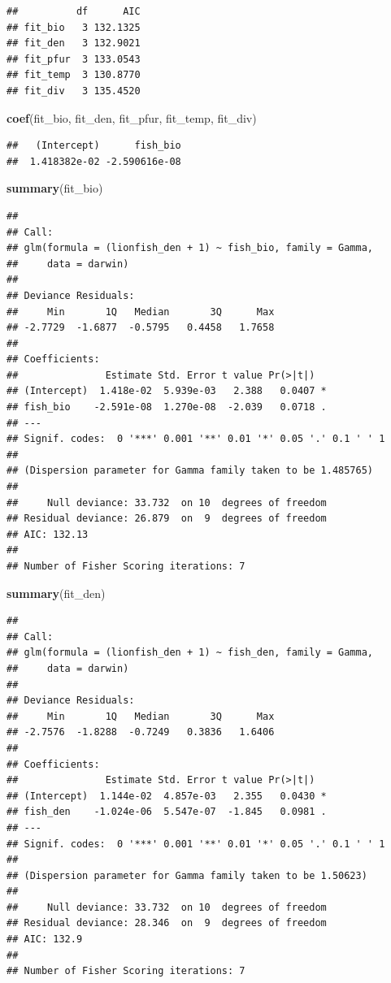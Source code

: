 \documentclass[]{article}
\newenvironment{Shaded}{\begin{snugshade}}{\end{snugshade}}
\newcommand{\KeywordTok}[1]{\textcolor[rgb]{0.13,0.29,0.53}{\textbf{#1}}}
\newcommand{\NormalTok}[1]{#1}
\begin{document}
\begin{verbatim}
##          df      AIC
## fit_bio   3 132.1325
## fit_den   3 132.9021
## fit_pfur  3 133.0543
## fit_temp  3 130.8770
## fit_div   3 135.4520
\end{verbatim}

\begin{Shaded}
\begin{Highlighting}[]
\KeywordTok{coef}\NormalTok{(fit_bio, fit_den, fit_pfur, fit_temp, fit_div)}
\end{Highlighting}
\end{Shaded}

\begin{verbatim}
##   (Intercept)      fish_bio 
##  1.418382e-02 -2.590616e-08
\end{verbatim}

\begin{Shaded}
\begin{Highlighting}[]
\KeywordTok{summary}\NormalTok{(fit_bio)}
\end{Highlighting}
\end{Shaded}

\begin{verbatim}
## 
## Call:
## glm(formula = (lionfish_den + 1) ~ fish_bio, family = Gamma, 
##     data = darwin)
## 
## Deviance Residuals: 
##     Min       1Q   Median       3Q      Max  
## -2.7729  -1.6877  -0.5795   0.4458   1.7658  
## 
## Coefficients:
##               Estimate Std. Error t value Pr(>|t|)  
## (Intercept)  1.418e-02  5.939e-03   2.388   0.0407 *
## fish_bio    -2.591e-08  1.270e-08  -2.039   0.0718 .
## ---
## Signif. codes:  0 '***' 0.001 '**' 0.01 '*' 0.05 '.' 0.1 ' ' 1
## 
## (Dispersion parameter for Gamma family taken to be 1.485765)
## 
##     Null deviance: 33.732  on 10  degrees of freedom
## Residual deviance: 26.879  on  9  degrees of freedom
## AIC: 132.13
## 
## Number of Fisher Scoring iterations: 7
\end{verbatim}

\begin{Shaded}
\begin{Highlighting}[]
\KeywordTok{summary}\NormalTok{(fit_den)}
\end{Highlighting}
\end{Shaded}

\begin{verbatim}
## 
## Call:
## glm(formula = (lionfish_den + 1) ~ fish_den, family = Gamma, 
##     data = darwin)
## 
## Deviance Residuals: 
##     Min       1Q   Median       3Q      Max  
## -2.7576  -1.8288  -0.7249   0.3836   1.6406  
## 
## Coefficients:
##               Estimate Std. Error t value Pr(>|t|)  
## (Intercept)  1.144e-02  4.857e-03   2.355   0.0430 *
## fish_den    -1.024e-06  5.547e-07  -1.845   0.0981 .
## ---
## Signif. codes:  0 '***' 0.001 '**' 0.01 '*' 0.05 '.' 0.1 ' ' 1
## 
## (Dispersion parameter for Gamma family taken to be 1.50623)
## 
##     Null deviance: 33.732  on 10  degrees of freedom
## Residual deviance: 28.346  on  9  degrees of freedom
## AIC: 132.9
## 
## Number of Fisher Scoring iterations: 7
\end{verbatim}
\end{document}

